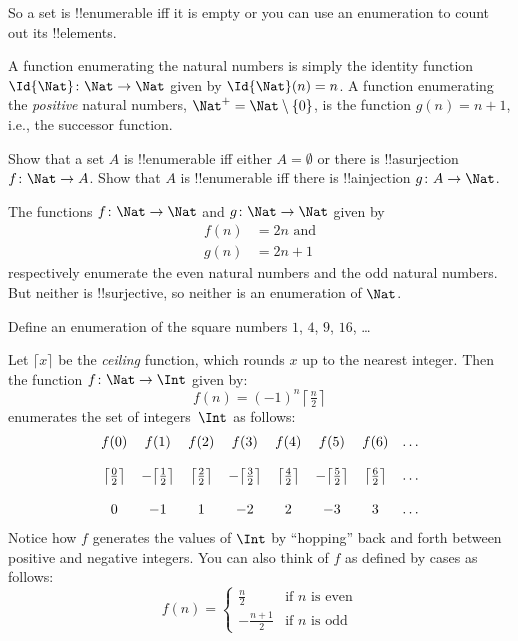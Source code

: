 \documentclass[../../../include/open-logic-section]{subfiles}
\begin{document}
\begin{explain}
So a set is !!{enumerable} iff it is empty or you can use an
enumeration to count out its !!{element}s.
\end{explain}

\begin{ex}
A function enumerating the natural numbers is simply the identity
function $\Id{\Nat} \colon \Nat \to \Nat$ given by $\Id{\Nat}(n) = n$. A
function enumerating the \emph{positive} natural numbers, $\Nat^+ =
\Nat \setminus \{0\}$, is the function $g(n) = n + 1$, i.e., the
successor function.
\end{ex}

\begin{prob}
Show that a set $A$ is !!{enumerable} iff either $A = \emptyset$ or
there is !!a{surjection} $f\colon \Nat \to A$. Show that $A$ is
!!{enumerable} iff there is !!a{injection} $g\colon A \to \Nat$. 
\end{prob}

\begin{ex}
The functions $f\colon \Nat \to \Nat$ and $g \colon \Nat \to \Nat$
given by
\begin{align*}
  f(n) & = 2n \text{ and}\\
  g(n) & = 2n+1
\end{align*}
respectively enumerate the even natural numbers and the odd natural
numbers. But neither is !!{surjective}, so neither is an enumeration
of $\Nat$.
\end{ex}

\begin{prob}
Define an enumeration of the square numbers $1$, $4$, $9$, $16$, \dots
\end{prob}

\begin{ex}
Let $\lceil x \rceil$ be the \emph{ceiling} function, which rounds $x$
up to the nearest integer. Then the function $f \colon \Nat \to \Int$
given by:
\[
  f(n) = (-1)^{n} \left\lceil\tfrac{n}{2}\right\rceil
\]
enumerates the set of
integers~$\Int$ as follows:
\[
\begin{array}{c c c c c c c c}
f(0) & f(1) & f(2) & f(3) & f(4) & f(5) & f(6) & \dots \\ \\
\big\lceil \tfrac{0}{2} \big\rceil & -\big\lceil \tfrac{1}{2}\big\rceil &  \big\lceil \tfrac{2}{2} \big\rceil & -\big\lceil \tfrac{3}{2} \big\rceil & \big\lceil \tfrac{4}{2} \big\rceil  & -\big\lceil \tfrac{5}{2}\big\rceil & \big\lceil \tfrac{6}{2} \big\rceil & \dots \\ \\
0 & -1 & 1 & -2 & 2 & -3 & 3& \dots
\end{array}
\]
Notice how $f$ generates the values of $\Int$ by ``hopping'' back and
forth between positive and negative integers. You can also think of
$f$ as defined by cases as follows:
\[
f(n) = \begin{cases}
  \frac{n}{2} & \text{if $n$ is even}\\
  -\frac{n+1}{2} & \text{if $n$ is odd}
  \end{cases}
\]
\end{ex}
\end{document}
